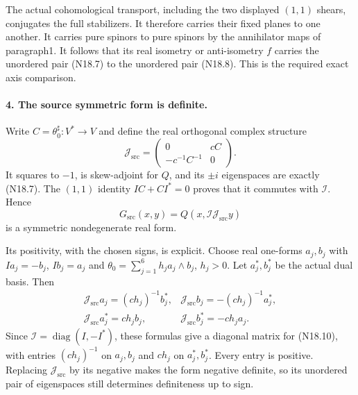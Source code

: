 The actual cohomological transport, including the two displayed
$(1,1)$ shears, conjugates the full stabilizers. It therefore
carries their fixed planes to one another. It carries pure
spinors to pure spinors by the annihilator maps of paragraph1.
It follows that its real isometry or anti-isometry $f$ carries
the unordered pair (N18.7) to the unordered pair (N18.8).
This is the required exact axis comparison.

\paragraph{4. The source symmetric form is definite.}
Write $C=\theta_0^\sharp:V^*\to V$ and define the real
orthogonal complex structure
\begin{equation}
 \mathcal J_{\mathrm{src}}=
       \begin{pmatrix}0&cC\\-c^{-1}C^{-1}&0\end{pmatrix}.
                                                        \tag{N18.9}
\end{equation}
It squares to $-1$, is skew-adjoint for $Q$, and its
$\pm i$ eigenspaces are exactly (N18.7). The $(1,1)$
identity $IC+CI^*=0$ proves that it commutes with
$\mathcal I$. Hence
\begin{equation}
          G_{\mathrm{src}}(x,y)
              =Q(x,\mathcal I\mathcal J_{\mathrm{src}}y)
                                                        \tag{N18.10}
\end{equation}
is a symmetric nondegenerate real form.

Its positivity, with the chosen signs, is explicit. Choose
real one-forms $a_j,b_j$ with $Ia_j=-b_j$, $Ib_j=a_j$ and
$\theta_0=\sum_{j=1}^6h_j a_j\wedge b_j$, $h_j>0$.
Let $a_j^*,b_j^*$ be the actual dual basis. Then
\[
 \begin{array}{ll}
 \mathcal J_{\mathrm{src}}a_j=(ch_j)^{-1}b_j^*,&
 \mathcal J_{\mathrm{src}}b_j=-(ch_j)^{-1}a_j^*,\\
 \mathcal J_{\mathrm{src}}a_j^*=ch_jb_j,&
 \mathcal J_{\mathrm{src}}b_j^*=-ch_ja_j.
 \end{array}
\]
Since $\mathcal I=\operatorname{diag}(I,-I^*)$, these
formulas give a diagonal matrix for (N18.10), with entries
$(ch_j)^{-1}$ on $a_j,b_j$ and $ch_j$ on $a_j^*,b_j^*$.
Every entry is positive. Replacing
$\mathcal J_{\mathrm{src}}$ by its negative makes the form
negative definite, so its unordered pair of eigenspaces
still determines definiteness up to sign.

